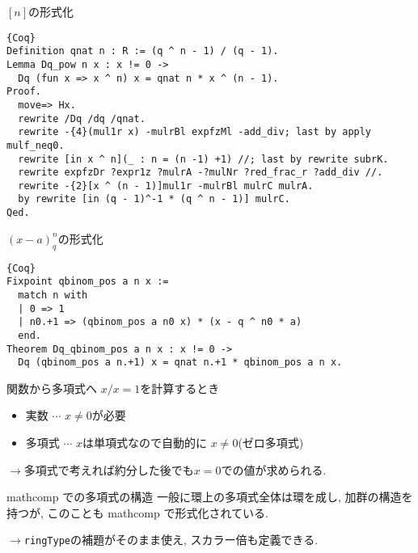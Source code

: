 \documentclass[unicode,mathserif]{beamer}
\begin{document}
\begin{frame}[fragile]
\begin{columns}[T]
\begin{column}{0.33\columnwidth}
		\begin{block}{$[n]$の形式化}
			\begin{lstlisting}{Coq}
Definition qnat n : R := (q ^ n - 1) / (q - 1).
Lemma Dq_pow n x : x != 0 ->
  Dq (fun x => x ^ n) x = qnat n * x ^ (n - 1).
Proof.
  move=> Hx.
  rewrite /Dq /dq /qnat.
  rewrite -{4}(mul1r x) -mulrBl expfzMl -add_div; last by apply mulf_neq0.
  rewrite [in x ^ n](_ : n = (n -1) +1) //; last by rewrite subrK.
  rewrite expfzDr ?expr1z ?mulrA -?mulNr ?red_frac_r ?add_div //.
  rewrite -{2}[x ^ (n - 1)]mul1r -mulrBl mulrC mulrA.
  by rewrite [in (q - 1)^-1 * (q ^ n - 1)] mulrC.
Qed. \end{lstlisting}
		\end{block}
		
		\begin{block}{$(x - a)^n_q$の形式化}
			\begin{lstlisting}{Coq}
Fixpoint qbinom_pos a n x :=
  match n with
  | 0 => 1
  | n0.+1 => (qbinom_pos a n0 x) * (x - q ^ n0 * a)
  end. 
Theorem Dq_qbinom_pos a n x : x != 0 ->
  Dq (qbinom_pos a n.+1) x = qnat n.+1 * qbinom_pos a n x. \end{lstlisting}
		\end{block}

		\begin{block}{関数から多項式へ}
			$x / x = 1$を計算するとき
			\begin{itemize}
				\item 実数 $\cdots$ $x \ne 0$が必要
				\item 多項式 $\cdots$ $x$は単項式なので自動的に $x \ne 0$(ゼロ多項式)
			\end{itemize}
			$\to$多項式で考えれば約分した後でも$x = 0$での値が求められる.
		\end{block}
		
		\begin{block}{mathcomp での多項式の構造}
			一般に環上の多項式全体は環を成し, 加群の構造を持つが, 
			このことも mathcomp で形式化されている. 
			
			$\to${\tt ringType}の補題がそのまま使え, スカラー倍も定義できる. 
		\end{block}
	\end{column}


\end{columns}
\end{frame}
\end{document}
